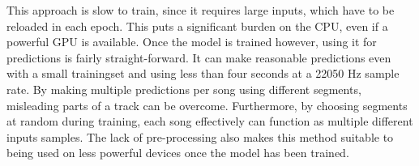 This approach is slow to train, since it requires large inputs, which have to be reloaded in each epoch. This puts a significant burden on the CPU, even if a powerful GPU is available.
Once the model is trained however, using it for predictions is fairly straight-forward. It can make reasonable predictions even with a small trainingset and using less than four seconds at a 22050 Hz sample rate. By making multiple predictions per song using different segments, misleading parts of a track can be overcome. Furthermore, by choosing segments at random during training, each song effectively can function as multiple different inputs samples. The lack of pre-processing also makes this method suitable to being used on less powerful devices once the model has been trained.